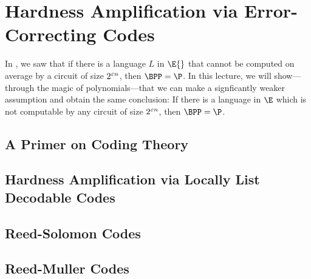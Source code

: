 \chapter{Hardness Amplification via Error-Correcting Codes}
\label{lec:03}

In , we saw that if there is a language $L$ in $\E{}$ that cannot
be computed on average by a circuit of size $2^{\varepsilon n}$, then $\BPP = \P$. In
this lecture, we will show---through the magic of polynomials---that we can
make a signficantly weaker assumption and obtain the same conclusion: If there
is a language in $\E$ which is not computable by any circuit of size $2^{\varepsilon
n}$, then $\BPP = \P$.

\section{A Primer on Coding Theory}

\section{Hardness Amplification via Locally List Decodable Codes}

\section{Reed-Solomon Codes}

\section{Reed-Muller Codes}
